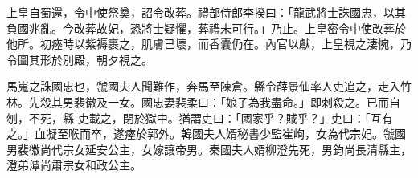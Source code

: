 \begin{pinyinscope}
 上皇自蜀還，令中使祭奠，詔令改葬。禮部侍郎李揆曰：「龍武將士誅國忠，以其負國兆亂。今改葬故妃，恐將士疑懼，葬禮未可行。」乃止。上皇密令中使改葬於他所。初瘞時以紫褥裹之，肌膚已壞，而香囊仍在。內官以獻，上皇視之淒惋，乃令圖其形於別殿，朝夕視之。



 馬嵬之誅國忠也，虢國夫人聞難作，奔馬至陳倉。縣令薛景仙率人吏追之，走入竹林。先殺其男裴徽及一女。國忠妻裴柔曰：「娘子為我盡命。」即刺殺之。已而自刎，不死，縣
 吏載之，閉於獄中。猶謂吏曰：「國家乎？賊乎？」吏曰：「互有之。」血凝至喉而卒，遂瘞於郭外。韓國夫人婿秘書少監崔峋，女為代宗妃。虢國男裴徽尚代宗女延安公主，女嫁讓帝男。秦國夫人婿柳澄先死，男鈞尚長清縣主，澄弟潭尚肅宗女和政公主。



\end{pinyinscope}